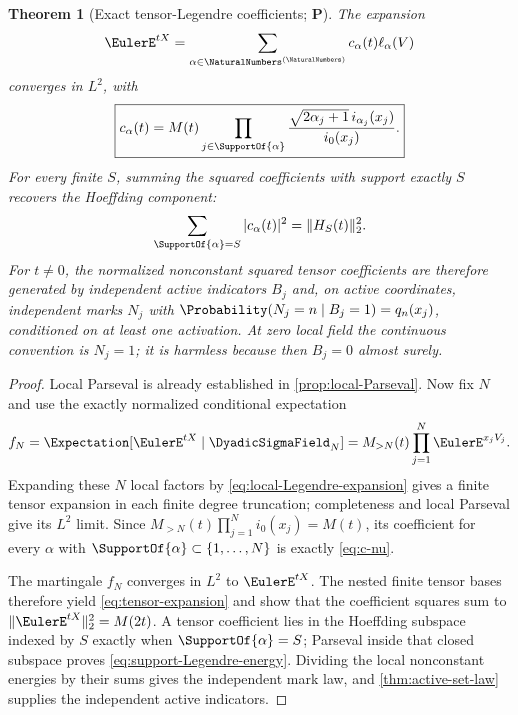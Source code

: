 \documentclass[11pt,oneside]{article}
\newtheorem{theorem}{Theorem}[section]
\theoremstyle{definition}
\theoremstyle{remark}
\newcommand{\statusP}{\textcolor{deepgreen}{\textbf{P}}}
\begin{document}
\begin{theorem}[Exact tensor-Legendre coefficients; \statusP]
\label{thm:tensor-Legendre}
The expansion
\begin{equation}
 \EulerE^{tX}=\sum_{\alpha\in\NaturalNumbers^{(\NaturalNumbers)}}c_\alpha(t)\ell_\alpha(V)
 \label{eq:tensor-expansion}
\end{equation}
converges in $L^2$, with
\begin{equation}
 \boxed{
 c_\alpha(t)=M(t)
 \prod_{j\in\SupportOf{\alpha}}
 \frac{\sqrt{2\alpha_j+1}\,i_{\alpha_j}(x_j)}{i_0(x_j)}.}
 \label{eq:c-nu}
\end{equation}
For every finite $S$, summing the squared coefficients with support exactly
$S$ recovers the Hoeffding component:
\begin{equation}
 \sum_{\SupportOf{\alpha}=S}|c_\alpha(t)|^2
 =\|H_S(t)\|_2^2.
 \label{eq:support-Legendre-energy}
\end{equation}
For $t\ne0$, the normalized \emph{nonconstant} squared tensor coefficients are
therefore generated by independent active indicators $B_j$ and, on active
coordinates, independent marks $N_j$ with
$\Probability(N_j=n\mid B_j=1)=q_n(x_j)$, conditioned on at least one activation.
At zero local field the continuous convention is $N_j=1$; it is harmless
because then $B_j=0$ almost surely.
\end{theorem}

\begin{proof}
Local Parseval is already established in \cref{prop:local-Parseval}.  Now fix
$N$ and use the exactly normalized conditional expectation
\[
 f_N=\Expectation[\EulerE^{tX}\mid\DyadicSigmaField_N]
 =M_{>N}(t)\prod_{j=1}^N\EulerE^{x_jV_j}.
\]
Expanding these $N$ local factors by
\eqref{eq:local-Legendre-expansion} gives a finite tensor expansion in each
finite degree truncation; completeness and local Parseval give its $L^2$
limit.  Since
$M_{>N}(t)\prod_{j=1}^Ni_0(x_j)=M(t)$, its coefficient for every $\alpha$ with
$\SupportOf{\alpha}\subset\{1,\ldots,N\}$ is exactly \eqref{eq:c-nu}.

The martingale $f_N$ converges in $L^2$ to $\EulerE^{tX}$.  The nested finite tensor
bases therefore yield \eqref{eq:tensor-expansion} and show that the coefficient
squares sum to $\|\EulerE^{tX}\|_2^2=M(2t)$.  A tensor coefficient lies in the
Hoeffding subspace indexed by $S$ exactly when $\SupportOf{\alpha}=S$; Parseval inside
that closed subspace proves \eqref{eq:support-Legendre-energy}.  Dividing the
local nonconstant energies by their sums gives the independent mark law, and
\cref{thm:active-set-law} supplies the independent active indicators.
\end{proof}
\end{document}
